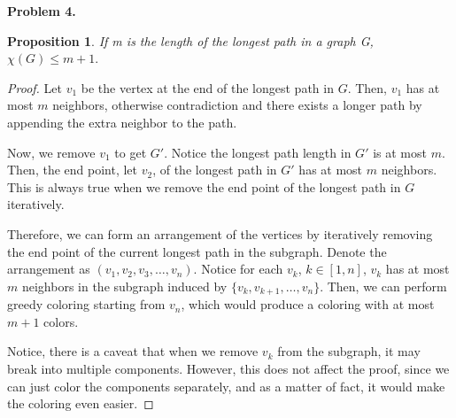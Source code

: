 \documentclass{article}
\newtheorem{prop}[thm]{Proposition}
\begin{document}
\textbf{Problem 4.}
\begin{prop}
    If m is the length of the longest path in a graph G, $\chi(G) \le m + 1.$
\end{prop}
\begin{proof}
    Let $v_1$ be the vertex at the end of the longest path in $G$.
    Then, $v_1$ has at most $m$ neighbors, otherwise contradiction and there exists a longer path by appending the extra neighbor to the path.

    Now, we remove $v_1$ to get $G'$. Notice the longest path length in $G'$ is at most $m$.
    Then, the end point, let $v_2$, of the longest path in $G'$ has at most $m$ neighbors.
    This is always true when we remove the end point of the longest path in $G$ iteratively.

    Therefore, we can form an arrangement of the vertices by iteratively removing the end point of the current longest path in the subgraph.
    Denote the arrangement as $(v_1, v_2, v_3, \dots, v_n)$. Notice for each $v_k$, $k \in [1, n]$, $v_k$ has at most $m$ neighbors in the subgraph induced by $\{v_k, v_{k+1}, \dots, v_n\}$.
    Then, we can perform greedy coloring starting from $v_n$, which would produce a coloring with at most $m+1$ colors.

    Notice, there is a caveat that when we remove $v_k$ from the subgraph, it may break into multiple components.
    However, this does not affect the proof, since we can just color the components separately, and as a matter of fact, it would make the coloring even easier.
\end{proof}
\end{document}
